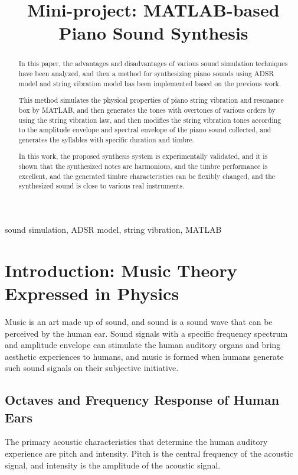 \documentclass[conference]{IEEEtran}
\begin{document}
\title{Mini-project: MATLAB-based Piano Sound Synthesis}
\author{
}
\maketitle
\begin{abstract}
	In this paper, the advantages and disadvantages of various sound simulation techniques have been analyzed, and then a method for synthesizing piano sounds using ADSR model and string vibration model has been implemented based on the previous work\cite{css_piano}\cite{cmf_piano}.

	This method simulates the physical properties of piano string vibration\cite{piano_model_ljs}\cite{piano_model_yz} and resonance box by MATLAB, and then generates the tones with overtones of various orders by using the string vibration law, and then modifies the string vibration tones according to the amplitude envelope and spectral envelope of the piano sound collected, and generates the syllables with specific duration and timbre.

	In this work, the proposed synthesis system is experimentally validated, and it is shown that the synthesized notes are harmonious, and the timbre performance is excellent, and the generated timbre characteristics can be flexibly changed, and the synthesized sound is close to various real instruments.
\end{abstract}

\begin{IEEEkeywords}
	sound simulation, ADSR model, string vibration, MATLAB
\end{IEEEkeywords}

\section{Introduction: Music Theory Expressed in Physics}
Music is an art made up of sound, and sound is a sound wave that can be perceived by the human ear. Sound signals with a specific frequency spectrum and amplitude envelope can stimulate the human auditory organs and bring aesthetic experiences to humans, and music is formed when humans generate such sound signals on their subjective initiative.

\subsection{Octaves and Frequency Response of Human Ears}
The primary acoustic characteristics that determine the human auditory experience are pitch and intensity. Pitch is the central frequency of the acoustic signal, and intensity is the amplitude of the acoustic signal.
\end{document}
